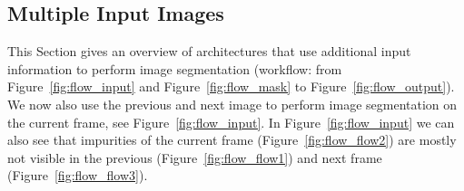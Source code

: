 \subsection{Multiple Input Images}
\label{ssec:num32}


This Section gives an overview of architectures that use additional input information to perform image segmentation (workflow: from Figure~\ref{fig:flow_input} and Figure~\ref{fig:flow_mask} to Figure~\ref{fig:flow_output}). We now also use the previous and next image to perform image segmentation on the current frame, see Figure~\ref{fig:flow_input}. In Figure~\ref{fig:flow_input} we can also see that impurities of the current frame (Figure~\ref{fig:flow_flow2}) are mostly not visible in the previous (Figure~\ref{fig:flow_flow1}) and next frame (Figure~\ref{fig:flow_flow3}). 


